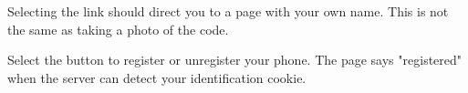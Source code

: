 \begin{minipage}[t]{1.0\linewidth}
\begin{center}
\begin{minipage}[t]{0.24\linewidth}
Selecting the link should direct
you to a page with your own name.
This is not the same as taking a photo of the code.
\end{minipage}
\hspace{3em}
\begin{minipage}[t]{0.24\linewidth}

Select the button to register or unregister your phone.
The page says "registered" when the server can detect
your identification cookie.

\end{minipage}
\end{center}

\end{minipage}